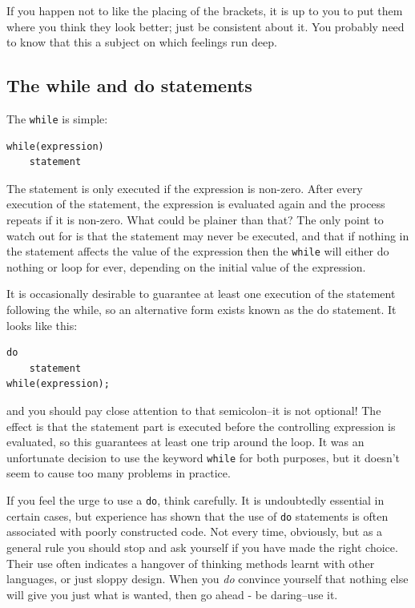    If you happen not to like the placing of the brackets, it is up to you
    to put them where you think they look better; just be consistent about it.
    You probably need to know that this a subject on which feelings run
    deep.


  

  \subsection{The while and do statements}
   

   The \texttt{while} is simple:


   \begin{Verbatim}
while(expression)
    statement
\end{Verbatim}

   The statement is only executed if the expression
    is non-zero. After every execution of the statement, the
    expression is evaluated again and the process repeats if it is
    non-zero. What could be plainer than that? The only point to watch out for
    is that the statement may never be executed, and that if
    nothing in the statement affects the value of the expression
    then the \texttt{while} will either do nothing or loop for ever,
    depending on the initial value of the expression.


   It is occasionally desirable to guarantee at least one execution of the
    statement following the while, so an alternative form exists known as the
    do statement. It looks like this:


   \begin{Verbatim}
do
    statement
while(expression);
\end{Verbatim}

   and you should pay close attention to that semicolon--it is not
    optional! The effect is that the statement part is executed before the
    controlling expression is evaluated, so this guarantees at least one trip
    around the loop. It was an unfortunate decision to use the keyword
    \texttt{while} for both purposes, but it doesn't seem to cause too
    many problems in practice.


   If you feel the urge to use a \texttt{do}, think carefully. It is
    undoubtedly essential in certain cases, but experience has shown that the
    use of \texttt{do} statements is often associated with poorly
    constructed code. Not every time, obviously, but as a general rule you
    should stop and ask yourself if you have made the right choice. Their use
    often indicates a hangover of thinking methods learnt with other
    languages, or just sloppy design. When you \textit{do} convince yourself
    that nothing else will give you just what is wanted, then go ahead - be
    daring--use it.


